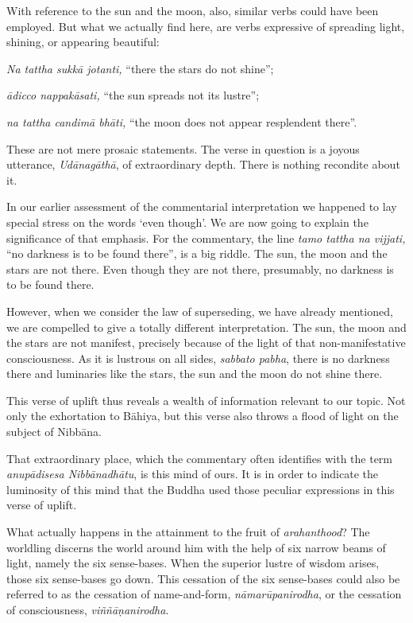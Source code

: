 With reference to the sun and the moon, also, similar verbs could have been employed. But what we actually find here, are verbs expressive of spreading light, shining, or appearing beautiful:

\emph{Na tattha sukkā jotanti,} ``there the stars do not shine'';

\emph{ādicco nappakāsati,} ``the sun spreads not its lustre'';

\emph{na tattha candimā bhāti,} ``the moon does not appear resplendent there''.

These are not mere prosaic statements. The verse in question is a joyous utterance, \emph{Udānagāthā}, of extraordinary depth. There is nothing recondite about it.

In our earlier assessment of the commentarial interpretation we happened to lay special stress on the words `even though'. We are now going to explain the significance of that emphasis. For the commentary, the line \emph{tamo tattha na vijjati,} ``no darkness is to be found there'', is a big riddle. The sun, the moon and the stars are not there. Even though they are not there, presumably, no darkness is to be found there.

However, when we consider the law of superseding, we have already mentioned, we are compelled to give a totally different interpretation. The sun, the moon and the stars are not manifest, precisely because of the light of that non-manifestative consciousness. As it is lustrous on all sides, \emph{sabbato pabha}, there is no darkness there and luminaries like the stars, the sun and the moon do not shine there.

This verse of uplift thus reveals a wealth of information relevant to our topic. Not only the exhortation to Bāhiya, but this verse also throws a flood of light on the subject of Nibbāna.

That extraordinary place, which the commentary often identifies with the term \emph{anupādisesa Nibbānadhātu}, is this mind of ours. It is in order to indicate the luminosity of this mind that the Buddha used those peculiar expressions in this verse of uplift.

What actually happens in the attainment to the fruit of \emph{arahanthood}? The worldling discerns the world around him with the help of six narrow beams of light, namely the six sense-bases. When the superior lustre of wisdom arises, those six sense-bases go down. This cessation of the six sense-bases could also be referred to as the cessation of name-and-form, \emph{nāmarūpanirodha}, or the cessation of consciousness, \emph{viññāṇanirodha}.

